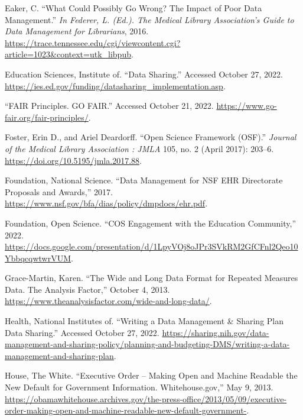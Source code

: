 \documentclass[
]{book}
\newlength{\cslhangindent}
\newlength{\cslentryspacingunit} %
\newenvironment{CSLReferences}[2] %
 {%
  \setlength{\parindent}{0pt}
  \ifodd #1
  \let\oldpar\par
  \def\par{\hangindent=\cslhangindent\oldpar}
  \fi
  \setlength{\parskip}{#2\cslentryspacingunit}
 }%
 {}
\begin{document}
\begin{CSLReferences}{1}{0}
\leavevmode{}%
Eaker, C. {``What Could Possibly Go Wrong? The Impact of Poor Data Management.''} \emph{In Federer, L. (Ed.). The Medical Library Association's Guide to Data Management for Librarians}, 2016. \url{https://trace.tennessee.edu/cgi/viewcontent.cgi?article=1023\&context=utk_libpub}.

\leavevmode{}%
Education Sciences, Institute of. {``Data Sharing.''} Accessed October 27, 2022. \url{https://ies.ed.gov/funding/datasharing_implementation.asp}.

\leavevmode{}%
{``{FAIR} Principles. {GO} {FAIR}.''} Accessed October 21, 2022. \url{https://www.go-fair.org/fair-principles/}.

\leavevmode{}%
Foster, Erin D., and Ariel Deardorff. {``Open Science Framework ({OSF}).''} \emph{Journal of the Medical Library Association : {JMLA}} 105, no. 2 (April 2017): 203--6. \url{https://doi.org/10.5195/jmla.2017.88}.

\leavevmode{}%
Foundation, National Science. {``Data Management for {NSF} {EHR} Directorate Proposals and Awards,''} 2017. \url{https://www.nsf.gov/bfa/dias/policy/dmpdocs/ehr.pdf}.

\leavevmode{}%
Foundation, Open Science. {``{COS} Engagement with the Education Community,''} 2022. \url{https://docs.google.com/presentation/d/1LpyVOj8oJPr3SVkRM2GfCFnl2Qeo10YbbqcqwtwrVUM}.

\leavevmode{}%
Grace-Martin, Karen. {``The Wide and Long Data Format for Repeated Measures Data. The Analysis Factor,''} October 4, 2013. \url{https://www.theanalysisfactor.com/wide-and-long-data/}.

\leavevmode{}%
Health, National Institutes of. {``Writing a Data Management \& Sharing Plan {\textbar} Data Sharing.''} Accessed October 27, 2022. \url{https://sharing.nih.gov/data-management-and-sharing-policy/planning-and-budgeting-DMS/writing-a-data-management-and-sharing-plan}.

\leavevmode{}%
House, The White. {``Executive Order -- Making Open and Machine Readable the New Default for Government Information. Whitehouse.gov,''} May 9, 2013. \url{https://obamawhitehouse.archives.gov/the-press-office/2013/05/09/executive-order-making-open-and-machine-readable-new-default-government-}.


\end{CSLReferences}
\end{document}
